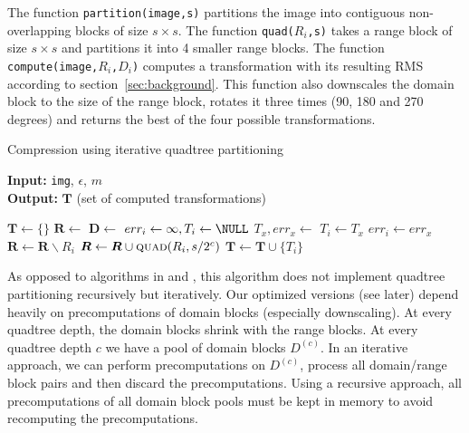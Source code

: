 The function \texttt{partition(image,s)} partitions the image into contiguous non-overlapping blocks of size $s \times s$.
The function \texttt{quad($R_i$,s)} takes a range block of size $s \times s$ and partitions it into 4 smaller range blocks.
The function \texttt{compute(image,$R_i$,$D_i$)} computes a transformation with its resulting RMS according to section~\ref{sec:background}.
This function also downscales the domain block to the size of the range block, rotates it three times (90, 180 and 270 degrees)
and returns the best of the four possible transformations.
\begin{algorithm}
\caption{Compression using iterative quadtree partitioning}\label{alg:baseline}
\hspace*{\algorithmicindent} \textbf{Input:} \texttt{img}, $\epsilon$, $m$ \\
\hspace*{\algorithmicindent} \textbf{Output:} $\boldsymbol{T}$ (set of computed transformations)
\begin{algorithmic}[1]
  \State $\boldsymbol{T} \gets \{\}$
  \State $\boldsymbol{R} \gets $ 
        \State $\boldsymbol{D} \gets $ 
            \State $err_i \gets \infty, T_i \gets \NULL$
              \State $T_x, err_x \gets $ 
                \State $T_i \gets T_x$
                \State $err_i \gets err_x$
              \EndIf
            \EndFor
        \EndFor
        \State $\boldsymbol{R} \gets \boldsymbol{R} \backslash  R_i$
          \State $\boldsymbol{R} \gets \boldsymbol{R} \cup  \Call{quad}{R_i, s/2^c}$
        \Else
          \State $\boldsymbol{T} \gets \boldsymbol{T} \cup \{T_i\}$
        \EndIf
    \EndFor
\end{algorithmic}
\end{algorithm}

As opposed to algorithms in \cite{fisher2012} and \cite{github-cpp}, this algorithm does not implement quadtree
partitioning recursively but iteratively.
Our optimized versions (see later) depend heavily on precomputations of domain blocks (especially downscaling).
At every quadtree depth, the domain blocks shrink with the range blocks. At every quadtree depth $c$ we have a pool of
domain blocks $D^{(c)}$. In an iterative approach, we can perform precomputations on $D^{(c)}$, process all domain/range block pairs
and then discard the precomputations. Using a recursive approach, all precomputations of all domain block pools must be kept in memory
to avoid recomputing the precomputations.

